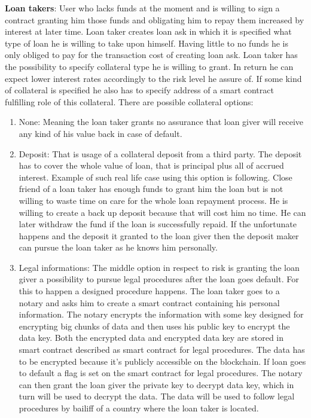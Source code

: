 \documentclass[a4paper,12pt,twoside,openany]{report}
\begin{document}
\textbf{Loan takers}: User who lacks funds at the moment and is willing to sign a contract granting him those funds and obligating him to repay them increased by interest at later time. Loan taker creates loan ask in which it is specified what type of loan he is willing to take upon himself. Having little to no funds he is only obliged to pay for the transaction cost of creating loan ask. Loan taker has the possibility to specify collateral type he is willing to grant. In return he can expect lower interest rates accordingly to the risk level he assure of. If some kind of collateral is specified he also has to specify address of a smart contract fulfilling role of this collateral. There are possible collateral options:
\begin{enumerate}
\item None: Meaning the loan taker grants no assurance that loan giver will receive any kind of his value back in case of default.
\item Deposit: That is usage of a collateral deposit from a third party. The deposit has to cover the whole value of loan, that is principal plus all of accrued interest. Example of such real life case using this option is following. Close friend of a loan taker has enough funds to grant him the loan but is not willing to waste time on care for the whole loan repayment process. He is willing to create a back up deposit because that will cost him no time. He can later withdraw the fund if the loan is successfully repaid. If the unfortunate happens and the deposit it granted to the loan giver then the deposit maker can pursue the loan taker as he knows him personally. 
\item Legal informations: The middle option in respect to risk is granting the loan giver a possibility to pursue legal procedures after the loan goes default. For this to happen a designed procedure happens. The loan taker goes to a notary and asks him to create a smart contract containing his personal information. The notary encrypts the information with some key designed for encrypting big chunks of data and then uses his public key to encrypt the data key. Both the encrypted data and encrypted data key are stored in smart contract described as smart contract for legal procedures. The data has to be encrypted because it's publicly accessible on the blockchain. If loan goes to default a flag is set on the smart contract for legal procedures. The notary can then grant the loan giver the private key to decrypt data key, which in turn will be used to decrypt the data. The data will be used to follow legal procedures by bailiff of a country where the loan taker is located.
\end{enumerate}
\end{document}
